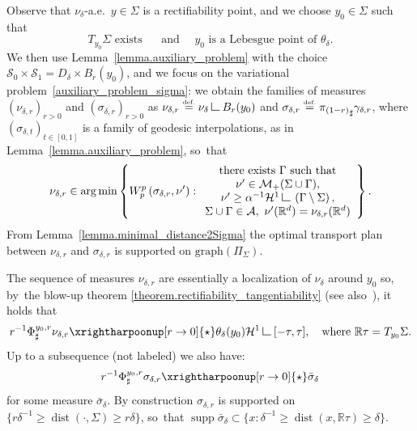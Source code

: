 \documentclass[10pt]{amsart}
\let\ts\textstyle
\theoremstyle{definition}
\newcommand{\eqdef}{\ensuremath{\stackrel{\mbox{\upshape\tiny def.}}{=}}}
\newcommand\LM[1]{\hbox{\vrule width.5pt \vbox to#1pt{\vfill \hrule width#1pt height.5pt}}}
\newcommand\LL{{\mathchoice {\>\LM7\>}{\>\LM7\>}{\,\LM5\,}{\,\LM{3.35}\,}}}
\newcommand{\mres}{\LL}
\newcommand{\RR}{\mathbb{R}}
\DeclareMathOperator*{\argmin}{arg\,min}
\DeclareMathOperator{\dist}{dist}
\DeclareMathOperator{\supp}{supp}
\begin{document}
Observe that $\nu_\delta$-a.e.~$y \in \Sigma$ is a rectifiability point, and we choose $y_0 \in \Sigma$ such that
\begin{equation}\label{y0fixed_for_blowup}
T_{y_0}\Sigma \text{ exists }
\quad\text{ and } \quad
y_0 \text{ is a Lebesgue point of }
\theta_\delta.
\end{equation}
We then use Lemma~\ref{lemma.auxiliary_problem} with the choice $\mathcal{S}_0\times \mathcal{S}_1 = D_{\delta}\times B_r(y_0)$, and we focus on the variational problem~\eqref{auxiliary_problem_sigma}: we obtain the families of measures $\left(\nu_{\delta ,r}\right)_{r > 0}$ and $\left(\sigma_{\delta ,r}\right)_{r > 0}$ as $\nu_{\delta ,r} \eqdef \nu_\delta \mres B_r(y_0)$ and $\sigma_{\delta ,r} \eqdef {\pi_{(1-r)}}_\sharp\gamma_{\delta,r}$, where $\left(\sigma_{\delta,t}\right)_{t \in [0,1]}$ is a family of geodesic interpolations, as in Lemma~\ref{lemma.auxiliary_problem}, so~that
\begin{equation}\label{auxiliary_problem_geodesic}
\nu_{\delta ,r}
\in
\argmin
\left\{
W_p^p\left(
\sigma_{\delta ,r}, \nu'
\right) :
\begin{array}{c}
\text{there exists $\Gamma$ such that}\\
\nu' \in \mathcal{M}_+(\Sigma \cup \Gamma),\\
\nu' \ge \alpha^{-1}\mathcal{H}^1\mres \left(\Gamma\setminus \Sigma\right), \\
\Sigma \cup \Gamma \in \mathcal{A}, \
\nu'(\RR^d) = \nu_{\delta ,r}(\RR^d)
\end{array}
\right\}.
\end{equation}
From Lemma~\ref{lemma.minimal_distance2Sigma} the optimal transport plan between $\nu_{\delta ,r}$ and $\sigma_{\delta ,r}$ is supported on $\text{graph}(\Pi_\Sigma)$.

The sequence of measures $\nu_{\delta ,r}$ are essentially a localization of $\nu_\delta$ around $y_0$ so, by~the blow-up theorem \ref{theorem.rectifiability_tangentiability} (see also~\cite[Th.\,2.83]{ambrosio2000functions}), it holds that
\begin{equation}\label{blowup_measures_nu}
r^{-1}\Phi^{y_0,r}_{\sharp}\nu_{\delta ,r} \xrightharpoonup[r \to 0]{\ts\star}
\theta_\delta(y_0)\mathcal{H}^1\mres [-\tau, \tau],
\quad\text{where $\RR\tau = T_{y_0}\Sigma$.}
\end{equation}
Up to a subsequence (not labeled) we also have:
\begin{equation}\label{blowup_measures_sigma}
r^{-1}\Phi^{y_0,r}_{\sharp}\sigma_{\delta ,r} \xrightharpoonup[r \to 0]{\ts\star}
\bar \sigma_{\delta}
\end{equation}
for some measure $\bar \sigma_{\delta}$.
By construction $\sigma_{\delta ,r}$ is supported on $\{r\delta^{-1}\ge\dist(\cdot,\Sigma)\ge r\delta\}$, so~that $\supp \bar \sigma_{\delta} \subset \{x : \delta^{-1} \ge \dist(x,\RR\tau) \ge \delta \}$.
\end{document}
